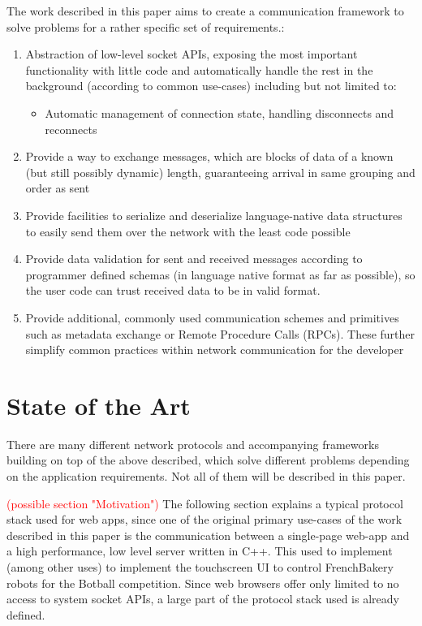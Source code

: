\documentclass[conference]{IEEEtran}
\begin{document}
The work described in this paper aims to create a communication framework to solve problems for a rather specific set of requirements.:

\begin{enumerate}
    \item Abstraction of low-level socket APIs, exposing the most important functionality with little code and automatically handle the rest in the background (according to common use-cases) including but not limited to:
    \begin{itemize}
        \item Automatic management of connection state, handling disconnects and reconnects
    \end{itemize}
    \item Provide a way to exchange messages, which are blocks of data of a known (but still possibly dynamic) length, guaranteeing arrival in same grouping and order as sent
    \item Provide facilities to serialize and deserialize language-native data structures to easily send them over the network with the least code possible
    \item Provide data validation for sent and received messages according to programmer defined schemas (in language native format as far as possible), so the user code can trust received data to be in valid format.
    \item Provide additional, commonly used communication schemes and primitives such as metadata exchange or Remote Procedure Calls (RPCs). These further simplify common practices within network communication for the developer
\end{enumerate}


\section{State of the Art}

There are many different network protocols and accompanying frameworks building on top of the above described, which solve different problems depending on the application requirements. Not all of them will be described in this paper.


\textcolor{red}{(possible section "Motivation")}
The following section explains a typical protocol stack used for web apps, since one of the original primary use-cases of the work described in this paper is the communication between a single-page web-app and a high performance, low level server written in C++. This used to implement (among other uses) to implement the touchscreen UI to control FrenchBakery robots for the Botball competition. Since web browsers offer only limited to no access to system socket APIs, a large part of the protocol stack used is already defined.
\end{document}

